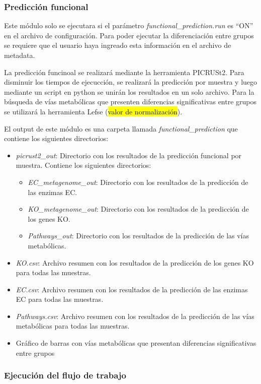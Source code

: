 \subsubsection{Predicción funcional}
Este módulo solo se ejecutara si el parámetro \textit{functional\_prediction.run} es ``ON'' en el archivo de configuración. 
Para poder ejecutar la diferenciación entre grupos se requiere que el usuario haya ingreado esta información en el archivo de metadata.

La predicción funcinoal se realizará mediante la herramienta PICRUSt2. 
Para disminuir los tiempos de ejecucción, se realizará la predicción por muestra y luego mediante un script en python se unirán los resultados en un solo archivo.
Para la búsqueda de vías metabólicas que presenten diferencias significativas entre grupos se utilizará la herramienta Lefse (\hl{valor de normalización}).

El output de este módulo es una carpeta llamada \textit{functional\_prediction} que contiene los siguientes directorios:
\begin{itemize}
    \item \textit{picrust2\_out}: Directorio con los resultados de la predicción funcional por muestra. Contiene los siguientes directorios:
    \begin{itemize}
        \item \textit{EC\_metagenome\_out}: Directorio con los resultados de la predicción de las enzimas EC.
        \item \textit{KO\_metagenome\_out}: Directorio con los resultados de la predicción de los genes KO.
        \item \textit{Pathways\_out}: Directorio con los resultados de la predicción de las vías metabólicas.
    \end{itemize}
    \item \textit{KO.csv}: Archivo resumen con los resultados de la predicción de los genes KO para todas las muestras.
    \item \textit{EC.csv}: Archivo resumen con los resultados de la predicción de las enzimas EC para todas las muestras.
    \item \textit{Pathways.csv}: Archivo resumen con los resultados de la predicción de las vías metabólicas para todas las muestras.
    \item Gráfico de barras con vías metabólicas que presentan diferencias significativas entre grupos
    \end{itemize}
\subsubsection{Ejecución del flujo de trabajo}

